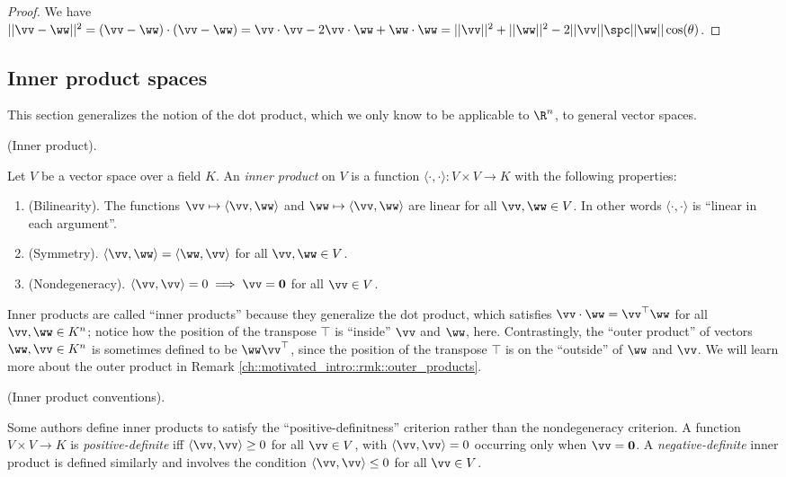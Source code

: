 \begin{proof}
    We have $||\vv - \ww||^2 = (\vv - \ww) \cdot (\vv - \ww) = \vv \cdot \vv - 2 \vv \cdot \ww + \ww \cdot \ww = ||\vv||^2 + ||\ww||^2 - 2 ||\vv|| \spc ||\ww|| \cos(\theta)$.
\end{proof}

\newpage

\subsection*{Inner product spaces}

This section generalizes the notion of the dot product, which we only know to be applicable to $\R^n$, to general vector spaces.

\begin{defn}
    \label{ch::lin_alg::defn::inner_product}
    (Inner product).
    
    Let $V$ be a vector space over a field $K$. An \textit{inner product} on $V$ is a function $\langle \cdot, \cdot \rangle:V \times V \rightarrow K$ with the following properties:

    \begin{enumerate}
        \item (Bilinearity). The functions $\vv \mapsto \langle \vv, \ww \rangle$ and $\ww \mapsto \langle \vv, \ww \rangle$ are linear for all $\vv, \ww \in V$. In other words $\langle \cdot, \cdot \rangle$ is ``linear in each argument''.
        \item (Symmetry). $\langle \vv, \ww \rangle = \langle \ww, \vv \rangle$ for all $\vv, \ww \in V$.
        \item (Nondegeneracy). $\langle \vv, \vv \rangle = 0 \implies \vv = \mathbf{0}$ for all $\vv \in V$.
    \end{enumerate}

    Inner products are called ``inner products'' because they generalize the dot product, which satisfies ${\vv \cdot \ww = \vv^\top \ww}$ for all $\vv, \ww \in K^n$; notice how the position of the transpose $\top$ is ``inside'' $\vv$ and $\ww$, here. Contrastingly, the ``outer product'' of vectors $\ww, \vv \in K^n$ is sometimes defined to be $\ww \vv^\top$, since the position of the transpose $\top$ is on the ``outside'' of $\ww$ and $\vv$. We will learn more about the outer product in Remark \ref{ch::motivated_intro::rmk::outer_products}.
\end{defn}

\begin{remark}
\label{ch::lin_alg::rmk::inner_product_conventions}
    (Inner product conventions).

    Some authors define inner products to satisfy the ``positive-definitness'' criterion rather than the nondegeneracy criterion. A function $V \times V \rightarrow K$ is \textit{positive-definite} iff $\langle \vv, \vv \rangle \geq 0$ for all $\vv \in V$, with $\langle \vv, \vv \rangle = 0$ occurring only when $\vv = \mathbf{0}$. A \textit{negative-definite} inner product is defined similarly and involves the condition $\langle \vv, \vv \rangle \leq 0$ for all $\vv \in V$.
\end{remark}

